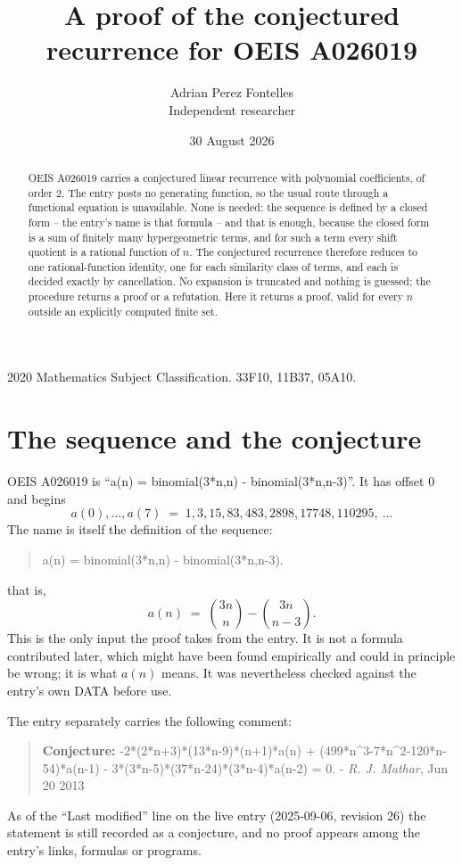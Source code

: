 \documentclass[11pt,a4paper]{article}
\title{A proof of the conjectured recurrence for OEIS A026019}
\author{Adrian Perez Fontelles\\ \small Independent researcher}
\date{30 August 2026}
\theoremstyle{plain}
\theoremstyle{definition}
\begin{document}
\maketitle

\begin{abstract}
OEIS A026019 carries a conjectured linear recurrence with polynomial coefficients, of
order 2. The entry posts no generating function, so the usual route through a
functional equation is unavailable. None is needed: the sequence is defined by a closed
form -- the entry's name is that formula -- and that is enough, because the closed form is a sum of finitely many hypergeometric terms, and for such a
term every shift quotient is a rational function of $n$. The conjectured recurrence
therefore reduces to one rational-function identity, one for each similarity
class of terms, and each is decided exactly by cancellation. No expansion is truncated and
nothing is guessed; the procedure returns a proof or a refutation. Here it returns a proof,
valid for every $n$ outside an explicitly computed finite set.
\end{abstract}

\noindent\small 2020 Mathematics Subject Classification. 33F10, 11B37, 05A10.\normalsize

\section{The sequence and the conjecture}

OEIS A026019 is ``a(n) = binomial(3*n,n) - binomial(3*n,n-3)''. It has offset $0$ and begins
\[
a(0),\dots,a(7)\;=\;1, 3, 15, 83, 483, 2898, 17748, 110295,\ \dots
\]
The name is itself the definition of the sequence:
\begin{quote}\small
a(n) = binomial(3*n,n) - binomial(3*n,n-3).
\end{quote}
that is,
\begin{equation}\label{eq:cf}
a(n)\;=\;{\binom{3 n}{n}} - {\binom{3 n}{n - 3}} .
\end{equation}
This is the only input the proof takes from the entry. It is not a formula contributed
later, which might have been found empirically and could in principle be wrong; it is what
$a(n)$ means. It was nevertheless checked against the entry's own DATA before use.

The entry separately carries the following comment:
\begin{quote}\small
\textbf{Conjecture:} -2*(2*n+3)*(13*n-9)*(n+1)*a(n) + (499*n\textasciicircum{}3-7*n\textasciicircum{}2-120*n-54)*a(n-1) - 3*(3*n-5)*(37*n-24)*(3*n-4)*a(n-2) = 0. - \emph{R. J. Mathar}, Jun 20 2013
\end{quote}
As of the ``Last modified'' line on the live entry (2025-09-06, revision 26) the
statement is still recorded as a conjecture, and no proof appears among the entry's links,
formulas or programs.
\end{document}
